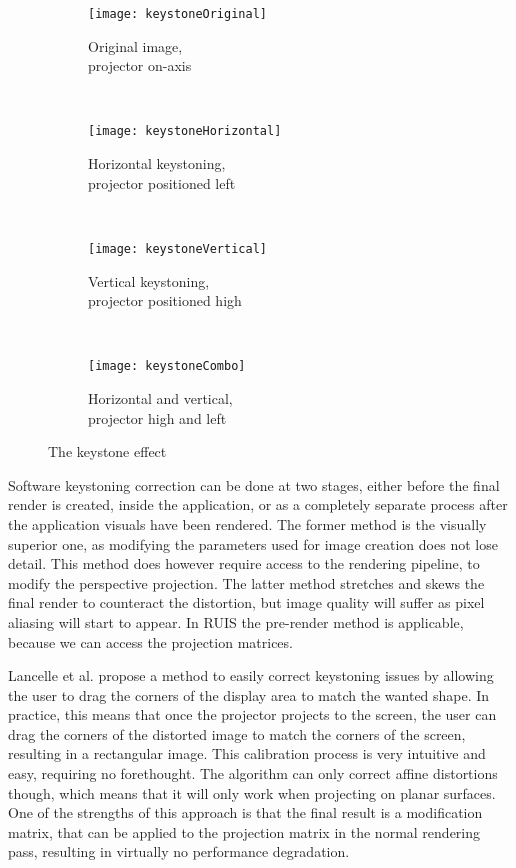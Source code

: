 \documentclass[12pt,a4paper,oneside,pdftex]{report}
\begin{document}
\begin{figure}[h]
    \centering
    \captionsetup{justification=centering}
    \begin{subfigure}{0.4\textwidth}
        \texttt{[image: keystoneOriginal]}
        \caption{Original image,\\projector on-axis}
        \label{subfig:keystoneOriginal}
    \end{subfigure}
    ~
    \begin{subfigure}{0.4\textwidth}
        \texttt{[image: keystoneHorizontal]}
        \caption{Horizontal keystoning,\\projector positioned left}
        \label{subfig:keystoneHorizontal}
    \end{subfigure}
    \\[1em]
    \begin{subfigure}{0.4\textwidth}
        \texttt{[image: keystoneVertical]}
        \caption{Vertical keystoning,\\projector positioned high}
        \label{subfig:keystoneVertical}
    \end{subfigure}
    ~
    \begin{subfigure}{0.4\textwidth}
        \texttt{[image: keystoneCombo]}
        \caption{Horizontal and vertical,\\projector high and left}
        \label{subfig:keystoneCombo}
    \end{subfigure}
    \caption{The keystone effect} \label{fig:keystoneEffect}
\end{figure}

Software keystoning correction can be done at two stages, either before the final render is created, inside the application, or as a completely separate process after the application visuals have been rendered. The former method is the visually superior one, as modifying the parameters used for image creation does not lose detail. This method does however require access to the rendering pipeline, to modify the perspective projection. The latter method stretches and skews the final render to counteract the distortion, but image quality will suffer as pixel aliasing will start to appear. In RUIS the pre-render method is applicable, because we can access the projection matrices.

Lancelle et al. \cite{TUGrazKeystoning} propose a method to easily correct keystoning issues by allowing the user to drag the corners of the display area to match the wanted shape. In practice, this means that once the projector projects to the screen, the user can drag the corners of the distorted image to match the corners of the screen, resulting in a rectangular image. This calibration process is very intuitive and easy, requiring no forethought. The algorithm can only correct affine distortions though, which means that it will only work when projecting on planar surfaces. One of the strengths of this approach is that the final result is a modification matrix, that can be applied to the projection matrix in the normal rendering pass, resulting in virtually no performance degradation.
\end{document}
